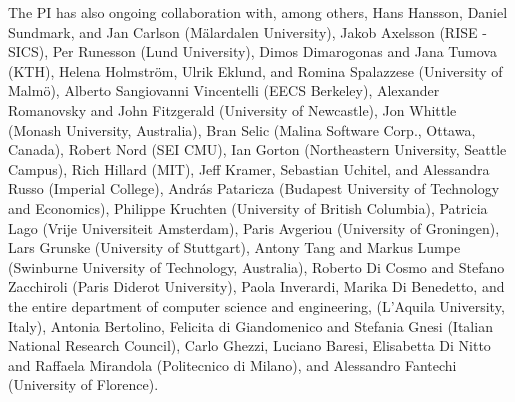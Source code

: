 \documentclass[12pt]{article}
\begin{document}
The PI has also ongoing collaboration with, among others, Hans Hansson, Daniel Sundmark, and Jan Carlson (M\"alardalen University), Jakob Axelsson (RISE - SICS), Per Runesson (Lund University), Dimos Dimarogonas and Jana Tumova (KTH), Helena Holmstr\"om, Ulrik Eklund, and Romina Spalazzese (University of Malm\"o), Alberto Sangiovanni Vincentelli (EECS Berkeley),
Alexander Romanovsky and John Fitzgerald (University of Newcastle), Jon Whittle (Monash University, Australia), Bran Selic (Malina Software Corp., Ottawa, Canada), Robert Nord (SEI CMU), Ian Gorton
(Northeastern University, Seattle Campus), Rich Hillard (MIT), Jeff Kramer, Sebastian Uchitel, and Alessandra Russo (Imperial College), Andr\'as Pataricza (Budapest University of Technology and Economics), Philippe Kruchten (University of British Columbia), Patricia Lago (Vrije Universiteit Amsterdam), Paris Avgeriou (University of Groningen), Lars Grunske (University of Stuttgart), Antony Tang and Markus Lumpe (Swinburne University of Technology, Australia), Roberto Di Cosmo and Stefano Zacchiroli (Paris Diderot University), Paola Inverardi, Marika Di Benedetto, and the entire department of computer science and engineering, %
(L'Aquila University, Italy), Antonia Bertolino, Felicita di Giandomenico and Stefania Gnesi (Italian National Research Council), Carlo Ghezzi, Luciano Baresi, Elisabetta Di Nitto and Raffaela Mirandola (Politecnico di Milano), and Alessandro Fantechi (University of Florence).
\end{document}
